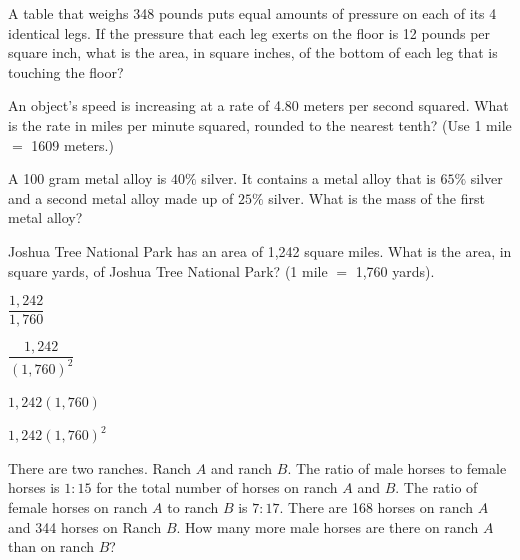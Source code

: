 \vfill
\noindent\begin{minipage}{\linewidth}
\par\smallskip
A table that weighs 348 pounds puts equal amounts of pressure on each of its 4 identical legs. If the pressure that each leg exerts on the floor is 12 pounds per square inch, what is the area, in square inches, of the bottom of each leg that is touching the floor?
\end{minipage}
\vfill
\clearpage
\noindent\begin{minipage}{\linewidth}
\par\smallskip
An object's speed is increasing at a rate of 4.80 meters per second squared. What is the rate in miles per minute squared, rounded to the nearest tenth? (Use 1 mile $=$ 1609 meters.)
\end{minipage}
\vfill
\noindent\begin{minipage}{\linewidth}
\par\smallskip
A 100 gram metal alloy is $40\%$ silver. It contains a metal alloy that is $65\%$ silver and a second metal alloy made up of $25\%$ silver. What is the mass of the first metal alloy?
\end{minipage}
\vfill
\noindent\begin{minipage}{\linewidth}
\par\smallskip
Joshua Tree National Park has an area of 1,242 square miles. What is the area, in square yards, of Joshua Tree National Park? (1 mile $=$ 1,760 yards).
\begin{satchoices}
  \item[A)] $\dfrac{1{,}242}{1{,}760}$
  \item[B)] $\dfrac{1{,}242}{(1{,}760)^2}$
  \item[C)] $1{,}242(1{,}760)$
  \item[D)] $1{,}242(1{,}760)^2$
\end{satchoices}
\end{minipage}
\vfill
\clearpage
\noindent\begin{minipage}{\linewidth}
\par\smallskip
There are two ranches. Ranch $A$ and ranch $B$. The ratio of male horses to female horses is $1:15$ for the total number of horses on ranch $A$ and $B$. The ratio of female horses on ranch $A$ to ranch $B$ is $7:17$. There are 168 horses on ranch $A$ and 344 horses on Ranch $B$. How many more male horses are there on ranch $A$ than on ranch $B$?
\end{minipage}

